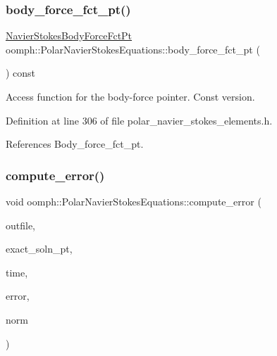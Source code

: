 \subsubsection{\texorpdfstring{body\+\_\+force\+\_\+fct\+\_\+pt()}{body\_force\_fct\_pt()}\hspace{0.1cm}{\footnotesize\ttfamily [2/2]}}
{\footnotesize\ttfamily \hyperlink{classoomph_1_1PolarNavierStokesEquations_adfe008551ad8039abe5c9bf23af8c0e3}{Navier\+Stokes\+Body\+Force\+Fct\+Pt} oomph\+::\+Polar\+Navier\+Stokes\+Equations\+::body\+\_\+force\+\_\+fct\+\_\+pt (\begin{DoxyParamCaption}{ }\end{DoxyParamCaption}) const\hspace{0.3cm}{\ttfamily [inline]}}



Access function for the body-\/force pointer. Const version. 



Definition at line 306 of file polar\+\_\+navier\+\_\+stokes\+\_\+elements.\+h.



References Body\+\_\+force\+\_\+fct\+\_\+pt.

\mbox{\label{classoomph_1_1PolarNavierStokesEquations_af05fc0ab81fac7f46c937220b9ca3ac0}} 
\subsubsection{\texorpdfstring{compute\+\_\+error()}{compute\_error()}\hspace{0.1cm}{\footnotesize\ttfamily [1/2]}}
{\footnotesize\ttfamily void oomph\+::\+Polar\+Navier\+Stokes\+Equations\+::compute\+\_\+error (\begin{DoxyParamCaption}\item[{std\+::ostream \&}]{outfile,  }\item[{\hyperlink{classoomph_1_1FiniteElement_ad4ecf2b61b158a4b4d351a60d23c633e}{Finite\+Element\+::\+Unsteady\+Exact\+Solution\+Fct\+Pt}}]{exact\+\_\+soln\+\_\+pt,  }\item[{const double \&}]{time,  }\item[{double \&}]{error,  }\item[{double \&}]{norm }\end{DoxyParamCaption})\hspace{0.3cm}{\ttfamily [virtual]}}



